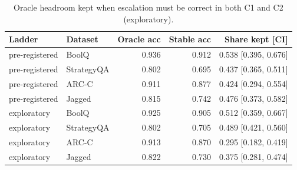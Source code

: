 \begin{table}[h!]
\centering
\small
\caption{Oracle headroom kept when escalation must be correct in both C1 and C2 (exploratory).}
\label{tab:oracle_stability}
\begin{tabular}{llrrr}
\toprule
Ladder & Dataset & Oracle acc & Stable acc & Share kept [CI] \\
\midrule
pre-registered & BoolQ & 0.936 & 0.912 & 0.538 [0.395, 0.676] \\
pre-registered & StrategyQA & 0.802 & 0.695 & 0.437 [0.365, 0.511] \\
pre-registered & ARC-C & 0.911 & 0.877 & 0.424 [0.294, 0.554] \\
pre-registered & Jagged & 0.815 & 0.742 & 0.476 [0.373, 0.582] \\
exploratory & BoolQ & 0.925 & 0.905 & 0.512 [0.359, 0.667] \\
exploratory & StrategyQA & 0.802 & 0.705 & 0.489 [0.421, 0.560] \\
exploratory & ARC-C & 0.913 & 0.870 & 0.295 [0.182, 0.419] \\
exploratory & Jagged & 0.822 & 0.730 & 0.375 [0.281, 0.474] \\
\bottomrule
\end{tabular}
\end{table}
